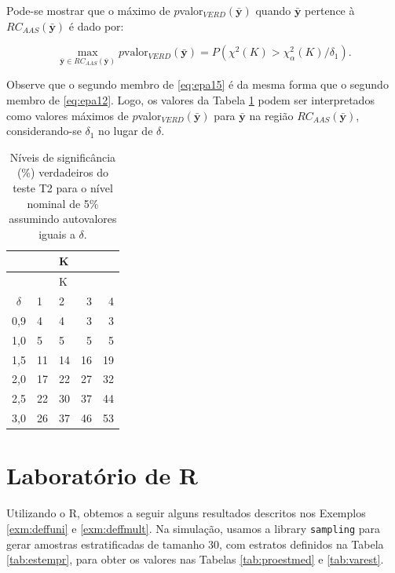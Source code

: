 \documentclass[]{book}
\theoremstyle{definition}
\theoremstyle{definition}
\theoremstyle{definition}
\theoremstyle{remark}
\begin{document}
Pode-se mostrar que o máximo de
\(p\)valor\(_{VERD}\left( \mathbf{\bar{y}}\right)\) quando
\(\mathbf{\bar{y}}\) pertence à
\(RC_{AAS}\left( \mathbf{\bar{y}}\right)\) é dado por:

\begin{equation}
\max_{\mathbf{\bar{y}\in }RC_{AAS}\left( \mathbf{\bar{y}}\right) }p
\mbox{valor}_{VERD}\left( \mathbf{\bar{y}}\right) =P\left( \chi ^{2}\left(K\right) >\chi _{\alpha }^{2}\left( K\right) /\delta _{1}\right).
\label{eq:epa15}
\end{equation}

Observe que o segundo membro de \eqref{eq:epa15} é da mesma forma que o
segundo membro de \eqref{eq:epa12}. Logo, os valores da Tabela
\ref{tab:nivsig} podem ser interpretados como valores máximos de
\(p\)valor\(_{VERD}\left( \mathbf{\bar{y}}\right)\) para
\(\mathbf{\bar{y}}\) na região
\(RC_{AAS}\left(\mathbf{\bar{y}}\right)\), considerando-se
\(\delta_{1}\) no lugar de \(\delta\).

\begin{longtable}[]{@{}cllrr@{}}
\caption{\label{tab:nivsig} Níveis de significância (\%) verdadeiros do
teste T2 para o nível nominal de 5\% assumindo autovalores iguais a
\(\delta\).}\tabularnewline
\toprule
& & K & &\tabularnewline
\midrule
\endfirsthead
\toprule
& & K & &\tabularnewline
\midrule
\endhead
\(\delta\) & 1 & 2 & 3 & 4\tabularnewline
0,9 & 4 & 4 & 3 & 3\tabularnewline
1,0 & 5 & 5 & 5 & 5\tabularnewline
1,5 & 11 & 14 & 16 & 19\tabularnewline
2,0 & 17 & 22 & 27 & 32\tabularnewline
2,5 & 22 & 30 & 37 & 44\tabularnewline
3,0 & 26 & 37 & 46 & 53\tabularnewline
\bottomrule
\end{longtable}

\section{Laboratório de R}\label{laboratorio-de-r-1}

Utilizando o R, obtemos a seguir alguns resultados descritos nos
Exemplos \ref{exm:deffuni} e \ref{exm:deffmult}. Na simulação, usamos a
library \texttt{sampling} \citep{R-sampling} para gerar amostras
estratificadas de tamanho 30, com estratos definidos na Tabela
\ref{tab:estempr}, para obter os valores nas Tabelas \ref{tab:proestmed}
e \ref{tab:varest}.
\end{document}
